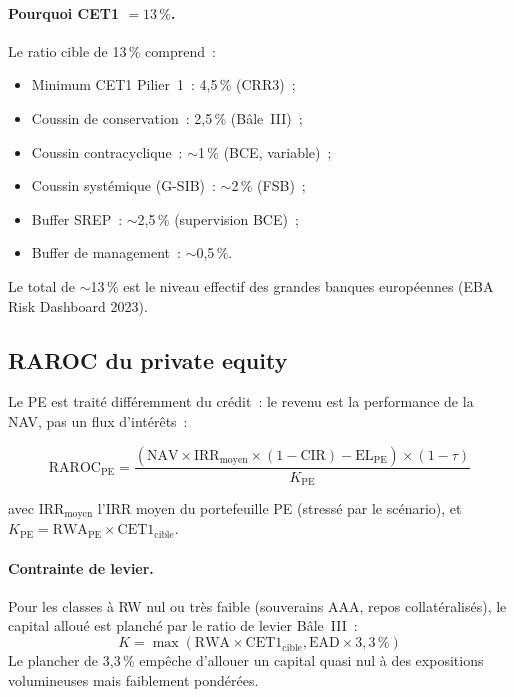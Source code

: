 \documentclass[12pt, a4paper, twoside, openright]{report}
\theoremstyle{definition}
\begin{document}
\paragraph{Pourquoi CET1 $= 13\,\%$.} Le ratio cible de 13\,\% comprend~:
\begin{itemize}[nosep]
  \item Minimum CET1 Pilier~1~: 4{,}5\,\% (CRR3)~;
  \item Coussin de conservation~: 2{,}5\,\% (Bâle~III)~;
  \item Coussin contracyclique~: $\sim$1\,\% (BCE, variable)~;
  \item Coussin systémique (G-SIB)~: $\sim$2\,\% (FSB)~;
  \item Buffer SREP~: $\sim$2{,}5\,\% (supervision BCE)~;
  \item Buffer de management~: $\sim$0{,}5\,\%.
\end{itemize}
Le total de $\sim$13\,\% est le niveau effectif des grandes banques européennes (EBA Risk Dashboard 2023).

\subsection{RAROC du private equity}

Le PE est traité différemment du crédit~: le revenu est la performance de la NAV, pas un flux d'intérêts~:

\begin{equation}
\text{RAROC}_{\text{PE}} = \frac{(\text{NAV} \times \text{IRR}_{\text{moyen}} \times (1 - \text{CIR}) - \text{EL}_{\text{PE}}) \times (1 - \tau)}{K_{\text{PE}}}
\label{eq:raroc-pe}
\end{equation}

\noindent avec $\text{IRR}_{\text{moyen}}$ l'IRR moyen du portefeuille PE (stressé par le scénario), et $K_{\text{PE}} = \text{RWA}_{\text{PE}} \times \text{CET1}_{\text{cible}}$.

\paragraph{Contrainte de levier.} Pour les classes à RW nul ou très faible (souverains AAA, repos collatéralisés), le capital alloué est planché par le ratio de levier Bâle~III~:
\begin{equation}
K = \max(\text{RWA} \times \text{CET1}_{\text{cible}}, \text{EAD} \times 3{,}3\,\%)
\label{eq:leverage-floor}
\end{equation}
Le plancher de 3{,}3\,\% empêche d'allouer un capital quasi nul à des expositions volumineuses mais faiblement pondérées.
\end{document}
